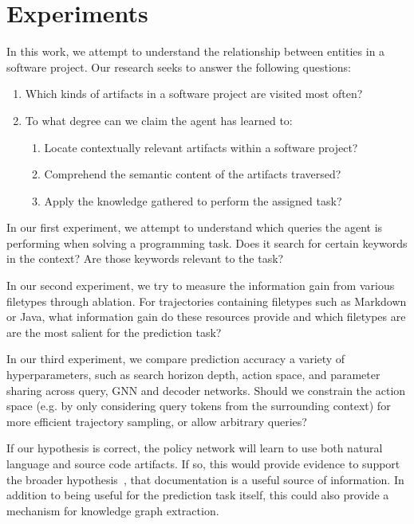 \documentclass[11pt]{article}
\begin{document}
\section{Experiments}

In this work, we attempt to understand the relationship between entities in a software project. Our research seeks to answer the following questions:

\begin{enumerate}
  \item Which kinds of artifacts in a software project are visited most often?
  \item To what degree can we claim the agent has learned to:\begin{enumerate}
  \item Locate contextually relevant artifacts within a software project?
  \item Comprehend the semantic content of the artifacts traversed?
  \item Apply the knowledge gathered to perform the assigned task?
  \end{enumerate}
\end{enumerate}

In our first experiment, we attempt to understand which queries the agent is performing when solving a programming task. Does it search for certain keywords in the context? Are those keywords relevant to the task?

In our second experiment, we try to measure the information gain from various filetypes through ablation. For trajectories containing filetypes such as Markdown or Java, what information gain do these resources provide and which filetypes are are the most salient for the prediction task?

In our third experiment, we compare prediction accuracy a variety of hyperparameters, such as search horizon depth, action space, and parameter sharing across query, GNN and decoder networks. Should we constrain the action space (e.g. by only considering query tokens from the surrounding context) for more efficient trajectory sampling, or allow arbitrary queries?

If our hypothesis is correct, the policy network will learn to use both natural language and source code artifacts. If so, this would provide evidence to support the broader hypothesis~\cite{guo2017semantically}, that documentation is a useful source of information. In addition to being useful for the prediction task itself, this could also provide a mechanism for knowledge graph extraction.
\end{document}
